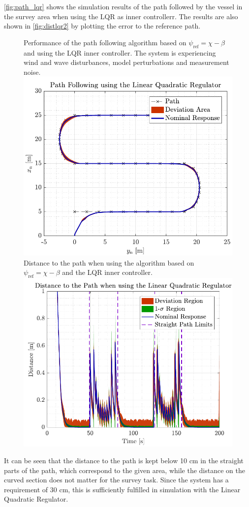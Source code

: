 \autoref{fig:path_lqr} shows the simulation results of the path followed by the vessel in the survey area when using the LQR as inner controllerr. The results are also shown in \autoref{fig:distlqr2} by plotting the error to the reference path.
\begin{figure}[H]
    \captionbox  
    {            
        Performance of the path following algorithm based on $\psi_\mathrm{ref}=\chi-\beta$ and using the LQR inner controller. The system is experiencing wind and wave disturbances, model perturbations and measurement noise.            
        \label{fig:path_lqr}                               
    }                                                                
    {                                                                 
        \includegraphics[width=.45\textwidth]{figures/path_lqr}    
    }                                                                  
    \hspace{5pt}                                                        
    \captionbox 
    {       
        Distance to the path when using the algorithm based on $\psi_\mathrm{ref}=\chi-\beta$ and the LQR inner controller.                                                                  %
        \label{fig:distlqr2}                                  
    }                                                                          
    {                                                                            
        \includegraphics[width=.45\textwidth]{figures/dist_lqr}          
    }                                                                            
\end{figure}
It can be seen that the distance to the path is kept below 10 cm in the straight parts of the path, which correspond to the given area, while the distance on the curved section does not matter for the survey task. Since the system has a requirement of 30 cm, this is sufficiently fulfilled in simulation with the Linear Quadratic Regulator.


